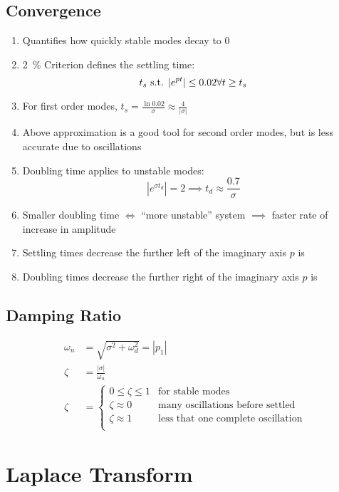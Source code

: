 \documentclass[8pt]{extarticle}
\begin{document}
\begin{multicols*}{3}
\subsection*{Convergence}
\begin{enumerate}
    \item Quantifies how quickly stable modes decay to 0
    \item \qty{2}{\percent} Criterion defines the settling time:
        \[
            t_s \text{ s.t. } |e^{pt}|\leq 0.02 \forall t \geq t_s
        \]
    \item For first order modes, \( t_s = \frac{\ln{0.02}}{\sigma} \approx \frac{4}{|\sigma|} \)
    \item Above approximation is a good tool for second order modes, but is less accurate due to oscillations
    \item Doubling time applies to unstable modes:
        \[
            |e^{\sigma t_d}| = 2 \implies t_d \approx \frac{0.7}{\sigma}
        \]
    \item Smaller doubling time \( \iff \) ``more unstable'' system \( \implies \) faster rate of increase in amplitude
    \item Settling times decrease the further left of the imaginary axis \( p \) is
    \item Doubling times decrease the further right of the imaginary axis \( p \) is
\end{enumerate}

\subsection*{Damping Ratio}
\begin{align*}
    \omega_n &= \sqrt{\sigma^2 + \omega_d^2} = |p_1| \\
    \zeta &= \frac{|\sigma|}{\omega_n} \\
    \zeta &= \begin{cases}
        0 \leq \zeta \leq 1 & \text{for stable modes} \\
        \zeta \approx 0 & \text{many oscillations before settled} \\
        \zeta \approx 1 & \text{less that one complete oscillation} \\
    \end{cases}
\end{align*}

\section*{Laplace Transform}

\end{multicols*}
\end{document}
